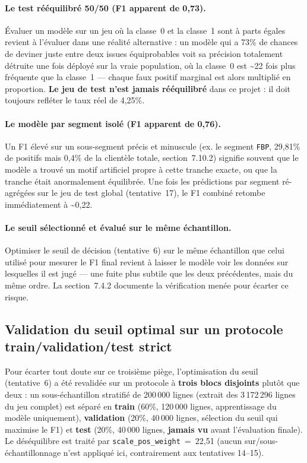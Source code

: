 \documentclass[11pt,a4paper]{report}
\begin{document}
\paragraph{Le test rééquilibré 50/50 (F1 apparent de 0,73).} Évaluer un
modèle sur un jeu où la classe~0 et la classe~1 sont à parts égales revient
à l'évaluer dans une réalité alternative : un modèle qui a 73\% de chances
de deviner juste entre deux issues équiprobables voit sa précision
totalement détruite une fois déployé sur la vraie population, où la
classe~0 est \textasciitilde 22 fois plus fréquente que la classe~1 — chaque
faux positif marginal est alors multiplié en proportion. \textbf{Le jeu de
test n'est jamais rééquilibré} dans ce projet : il doit toujours refléter
le taux réel de 4,25\%.

\paragraph{Le modèle par segment isolé (F1 apparent de 0,76).} Un F1 élevé
sur un sous-segment précis et minuscule (ex. le segment \texttt{FBP},
29,81\% de positifs mais 0,4\% de la clientèle totale, section~7.10.2)
signifie souvent que le modèle a trouvé un motif artificiel propre à cette
tranche exacte, ou que la tranche était anormalement équilibrée. Une fois
les prédictions par segment ré-agrégées sur le jeu de test global
(tentative~17), le F1 combiné retombe immédiatement à \textasciitilde 0,22.

\paragraph{Le seuil sélectionné et évalué sur le même échantillon.}
Optimiser le seuil de décision (tentative~6) sur le même échantillon que
celui utilisé pour mesurer le F1 final revient à laisser le modèle
\og voir \fg{} les données sur lesquelles il est jugé — une fuite plus
subtile que les deux précédentes, mais du même ordre. La section~7.4.2
documente la vérification menée pour écarter ce risque.

\subsection{Validation du seuil optimal sur un protocole train/validation/test strict}
\statutFait{}
Pour écarter tout doute sur ce troisième piège, l'optimisation du seuil
(tentative~6) a été revalidée sur un protocole à \textbf{trois blocs
disjoints} plutôt que deux : un sous-échantillon stratifié de 200\,000
lignes (extrait des 3\,172\,296 lignes du jeu complet) est séparé en
\textbf{train} (60\%, 120\,000 lignes, apprentissage du modèle
uniquement), \textbf{validation} (20\%, 40\,000 lignes, sélection du
seuil qui maximise le F1) et \textbf{test} (20\%, 40\,000 lignes,
\textbf{jamais vu} avant l'évaluation finale). Le déséquilibre est
traité par \texttt{scale\_pos\_weight}~=~22,51 (aucun sur/sous-échantillonnage
n'est appliqué ici, contrairement aux tentatives 14--15).
\end{document}

